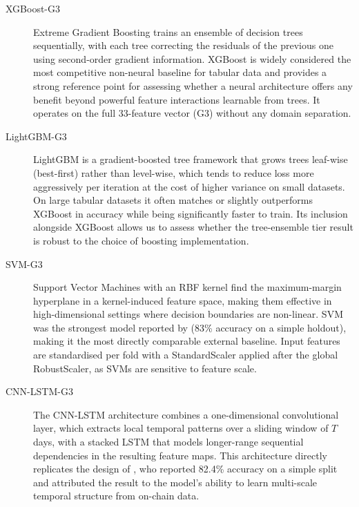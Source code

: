 \documentclass[final,3p,times,authoryear]{elsarticle}
\begin{document}
\begin{description}

  \item[XGBoost-G3] \citep{chen2016xgboost}
    Extreme Gradient Boosting trains an ensemble of decision trees
    sequentially, with each tree correcting the residuals of the
    previous one using second-order gradient information.
    XGBoost is widely considered the most competitive non-neural
    baseline for tabular data \citep{grinsztajn2022tree} and
    provides a strong reference point for assessing whether a
    neural architecture offers any benefit beyond powerful
    feature interactions learnable from trees.
    It operates on the full 33-feature vector (G3) without any
    domain separation.

  \item[LightGBM-G3] \citep{ke2017lightgbm}
    LightGBM is a gradient-boosted tree framework that grows trees
    leaf-wise (best-first) rather than level-wise, which tends to
    reduce loss more aggressively per iteration at the cost of
    higher variance on small datasets.
    On large tabular datasets it often matches or slightly outperforms
    XGBoost in accuracy while being significantly faster to train.
    Its inclusion alongside XGBoost allows us to assess whether the
    tree-ensemble tier result is robust to the choice of boosting
    implementation.

  \item[SVM-G3] \citep{cortes1995svm}
    Support Vector Machines with an RBF kernel find the maximum-margin
    hyperplane in a kernel-induced feature space, making them
    effective in high-dimensional settings where decision boundaries
    are non-linear.
    SVM was the strongest model reported by \citet{omole2025eaai}
    (83\% accuracy on a simple holdout), making it the most directly
    comparable external baseline.
    Input features are standardised per fold with a StandardScaler
    applied after the global RobustScaler, as SVMs are sensitive to
    feature scale.

  \item[CNN-LSTM-G3] \citep{LeCun2015}
    The CNN-LSTM architecture combines a one-dimensional convolutional
    layer, which extracts local temporal patterns over a sliding
    window of $T$ days, with a stacked LSTM that models longer-range
    sequential dependencies in the resulting feature maps.
    This architecture directly replicates the design of
    \citet{omole2024financial}, who reported 82.4\% accuracy on a
    simple split and attributed the result to the model's ability to
    learn multi-scale temporal structure from on-chain data.

\end{description}
\end{document}
